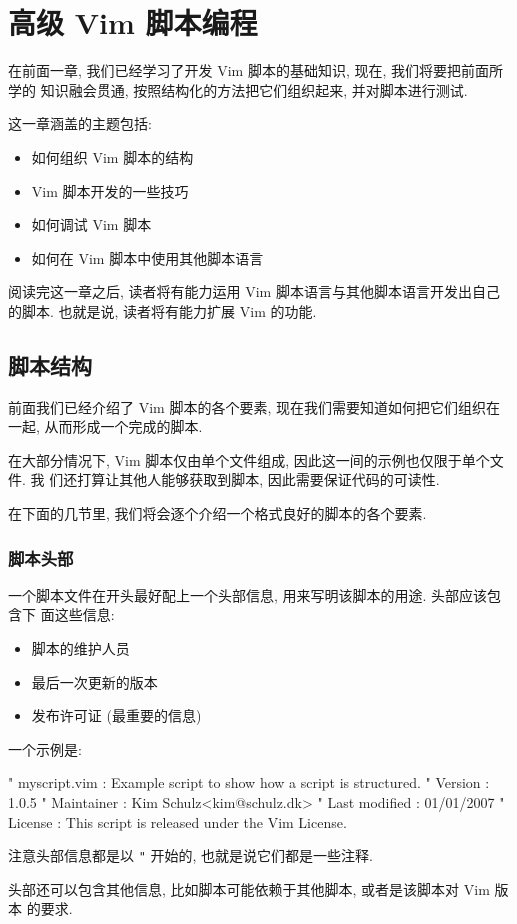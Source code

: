 \chapter{高级 Vim 脚本编程}
\label{chap:extended_vim_scripting}

在前面一章, 我们已经学习了开发 Vim 脚本的基础知识, 现在, 我们将要把前面所学的
知识融会贯通, 按照结构化的方法把它们组织起来, 并对脚本进行测试.

这一章涵盖的主题包括:
\begin{itemize}
    \item 如何组织 Vim 脚本的结构
    \item Vim 脚本开发的一些技巧
    \item 如何调试 Vim 脚本
    \item 如何在 Vim 脚本中使用其他脚本语言
\end{itemize}

阅读完这一章之后, 读者将有能力运用 Vim 脚本语言与其他脚本语言开发出自己的脚本.
也就是说, 读者将有能力扩展 Vim 的功能.

\section{脚本结构}
\label{sec:script_structure}

前面我们已经介绍了 Vim 脚本的各个要素, 现在我们需要知道如何把它们组织在一起,
从而形成一个完成的脚本.

在大部分情况下, Vim 脚本仅由单个文件组成, 因此这一间的示例也仅限于单个文件. 我
们还打算让其他人能够获取到脚本, 因此需要保证代码的可读性.

在下面的几节里, 我们将会逐个介绍一个格式良好的脚本的各个要素.

\subsection{脚本头部}
\label{subsec:script_header}

一个脚本文件在开头最好配上一个头部信息, 用来写明该脚本的用途. 头部应该包含下
面这些信息:
\begin{itemize}
    \item 脚本的维护人员
    \item 最后一次更新的版本
    \item 发布许可证 (最重要的信息)
\end{itemize}
一个示例是:
\begin{vimcode}
    " myscript.vim  : Example script to show how a script is structured.
    " Version       : 1.0.5
    " Maintainer    : Kim Schulz<kim@schulz.dk>
    " Last modified : 01/01/2007
    " License       : This script is released under the Vim License.
\end{vimcode}
注意头部信息都是以 \texttt{"} 开始的, 也就是说它们都是一些注释.

头部还可以包含其他信息, 比如脚本可能依赖于其他脚本, 或者是该脚本对 Vim 版本
的要求.
